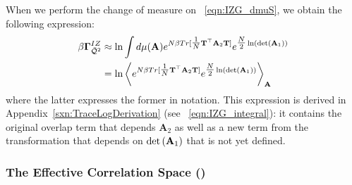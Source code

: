 
When we perform the change of measure on
\EQN~\ref{eqn:IZG_dmuS},
we obtain the following expression: %
\begin{align}
  \label{eqn:IFA2_integral}
  \nonumber 
  \beta\mathbf{\Gamma}^{IZ}_{\bar{\mathcal{Q}}^{2}} 
  &\approx 
  \ln \int d\mu(\mathbf{A})
  e^{N\beta Tr[\tfrac{1}{N}{\mathbf{T}}^{\top}\mathbf{A}_{2}{\mathbf{T}}] }
  e^{\tfrac{N}{2}\ln(\mbox{}{\text{det}}\left(\mathbf{A}_{1}\right))} \\
  & = 
  \ln
  \left\langle
  e^{N\beta Tr[\tfrac{1}{N}{\mathbf{T}}^{\top}\mathbf{A}_{2}{\mathbf{T}}] }
  e^{\tfrac{N}{2}\ln(\mbox{}{\text{det}}\left(\mathbf{A}_{1}\right))}
    \right\rangle_{\mathbf{A}}
\end{align}
where the latter expresses the former in \BraKet notation.
This expression is derived in Appendix~\ref{sxn:TraceLogDerivation} (see \EQN~\ref{eqn:IZG_integral}):
it contains the original overlap term that depends $\mathbf{A}_{2}$ as well as a new term from
the transformation that depends on $\mbox{}{\text{det}}\left(\mathbf{A}_{1}\right)$ that is not yet defined.


\subsubsection{The Effective Correlation Space (\ECS)}

